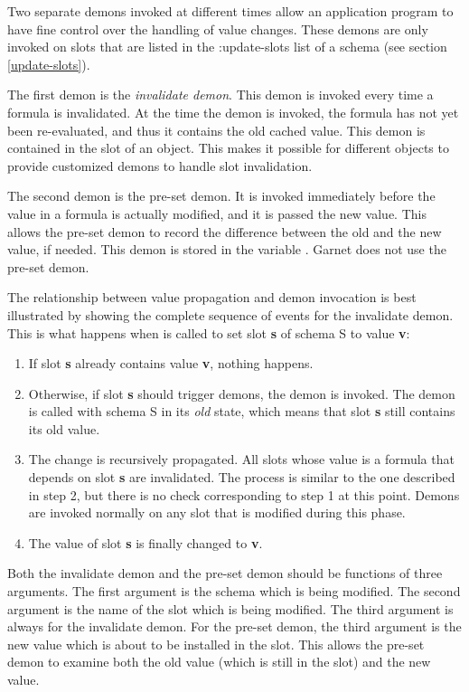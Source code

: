 Two separate demons invoked at different times allow an application
program to have fine control over the handling of value changes.
These demons are only invoked on slots that are listed in the
{\sc :update-slots} list of a schema (see section \ref{update-slots}).

The first demon is the {\it invalidate demon}.  This
demon is invoked every
time a formula is invalidated.  At the time the demon is invoked, the
formula has not yet been re-evaluated, and thus it contains the old cached
value.  This demon is contained in the  slot of
an object.  This makes it possible for different objects to provide
customized demons to handle slot invalidation.

The second demon is the pre-set demon.  It is
invoked immediately before the value in a formula is actually
modified, and it is passed the new value.  This allows the pre-set
demon to record the difference between the old and the new value, if
needed.  This demon is stored in the variable
 .  Garnet does not use
the pre-set demon.


The relationship between value propagation and demon invocation is best
illustrated by showing the complete sequence of events for the invalidate
demon.  This is what
happens when  is called to set slot {\bf s} of schema S to value
{\bf v}:
\begin{enumerate}
\item If slot {\bf s} already contains value {\bf v}, nothing happens.

\item Otherwise, if slot {\bf s} should trigger demons, the demon is
invoked.  The demon is called with schema S in its {\it old} state,
which means that slot {\bf s} still contains its old value.

\item The change is recursively propagated.  All slots whose value is a formula
that depends on slot {\bf s} are invalidated.  The process is similar to the
one described in step 2, but there is no check corresponding to step 1 at
this point.  Demons are invoked normally on any slot that is modified
during this phase.

\item The value of slot {\bf s} is finally changed to {\bf v}.
\end{enumerate}

Both the invalidate demon and the pre-set demon should be functions of
three arguments.  The first argument is the schema which is being modified.
The second argument is the name of the slot which is being modified.  The
third argument is always \value{nil} for the invalidate demon.  For the
pre-set demon, the third argument is the new value which is about to be
installed in the slot.  This allows the pre-set demon to examine both the
old value (which is still in the slot) and the new value.


